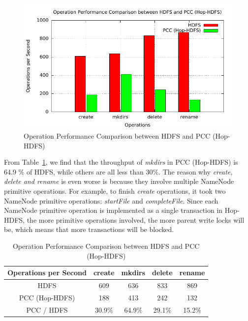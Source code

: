\begin{figure}[h]
	\centering
	\includegraphics[width=\linewidth]{figs/nn_100.pdf}
	\caption{Operation Performance Comparison between HDFS and PCC (Hop-HDFS)}
	\label{fig:nntp}
\end{figure}

\noindent From Table~\ref{table:nntpb}, we find that the throughput of \textit{mkdirs} in PCC (Hop-HDFS) is 64.9 \% of HDFS, while others are all less than 30\%. The reason why \textit{create, delete and rename} is even worse is because they involve multiple NameNode primitive operations. For example, to finish \textit{create} operations, it took two NameNode primitive operations: \textit{startFile} and \textit{completeFile}. Since each NameNode primitive operation is implemented as a single transaction in Hop-HDFS, the more primitive operations involved, the more parent write locks will be, which means that more transactions will be blocked.
\begin{table}[h]
	\centering
	\begin{tabular}{|c|c|c|c|c|}
		\hline
		\textbf{Operations per Second} & \textbf{create} & \textbf{mkdirs} & \textbf{delete} & \textbf{rename} \\ \hline
		HDFS                           & 609             & 636             & 833             & 869             \\ \hline
		PCC (Hop-HDFS)                 & 188             & 413             & 242             & 132             \\ \hline
		PCC / HDFS              & 30.9\%          & 64.9\%          & 29.1\%          & 15.2\%          \\ \hline
	\end{tabular}
	\caption{Operation Performance Comparison between HDFS and PCC (Hop-HDFS)}
	\label{table:nntpb}
\end{table}
